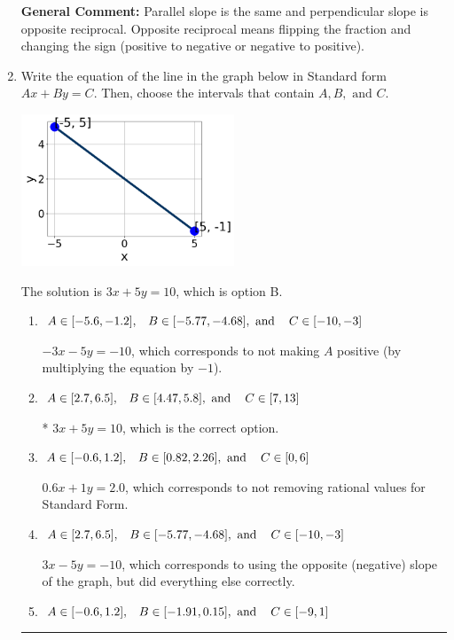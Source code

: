\documentclass{extbook}[14pt]
\newcommand{\litem}[1]{\item #1

\rule{\textwidth}{0.4pt}}
\begin{document}
\begin{enumerate}
{\textbf{General Comment:} Parallel slope is the same and perpendicular slope is opposite reciprocal. Opposite reciprocal means flipping the fraction and changing the sign (positive to negative or negative to positive).
}
\litem{
Write the equation of the line in the graph below in Standard form $Ax+By=C$. Then, choose the intervals that contain $A, B, \text{ and } C$.

\begin{center}
    \includegraphics[width=0.5\textwidth]{../Figures/linearGraphToStandardCopyA.png}
\end{center}


The solution is \( 3x + 5y = 10 \), which is option B.\begin{enumerate}[label=\Alph*.]
\item \( A \in [-5.6, -1.2], \hspace{3mm} B \in [-5.77, -4.68], \text{ and } \hspace{3mm} C \in [-10, -3] \)

 $-3x - 5y = -10$, which corresponds to not making $A$ positive (by multiplying the equation by $-1$).
\item \( A \in [2.7, 6.5], \hspace{3mm} B \in [4.47, 5.8], \text{ and } \hspace{3mm} C \in [7, 13] \)

* $3x + 5y = 10$, which is the correct option.
\item \( A \in [-0.6, 1.2], \hspace{3mm} B \in [0.82, 2.26], \text{ and } \hspace{3mm} C \in [0, 6] \)

 $0.6x + 1y = 2.0$, which corresponds to not removing rational values for Standard Form.
\item \( A \in [2.7, 6.5], \hspace{3mm} B \in [-5.77, -4.68], \text{ and } \hspace{3mm} C \in [-10, -3] \)

 $3x - 5y = -10$, which corresponds to using the opposite (negative) slope of the graph, but did everything else correctly.
\item \( A \in [-0.6, 1.2], \hspace{3mm} B \in [-1.91, 0.15], \text{ and } \hspace{3mm} C \in [-9, 1] \)


\end{enumerate}}
\end{enumerate}
\end{document}
